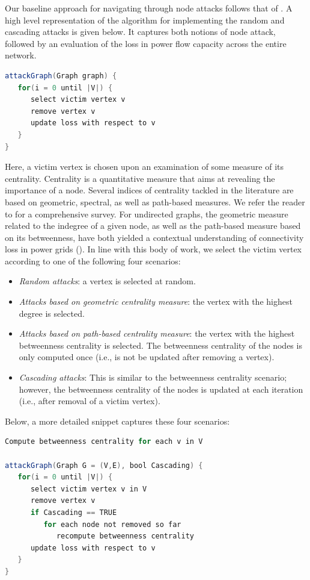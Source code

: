 Our baseline approach for navigating through node attacks follows that of \cite{2000Natur.406..378A}. A high level representation of the algorithm for implementing the random and cascading attacks is given below. It captures both notions of node attack, followed by an evaluation of the loss in power flow capacity across the entire network.
\begin{lstlisting}[language=java]
attackGraph(Graph graph) {
   for(i = 0 until |V|) {
      select victim vertex v
      remove vertex v
      update loss with respect to v
   }
}
\end{lstlisting}
Here, a victim vertex is chosen upon an examination of some measure of its centrality. Centrality is a quantitative measure that aims at revealing the importance of a node. Several indices of centrality tackled in the literature are based on geometric, spectral, as well as path-based measures. We refer the reader to \cite{BoldiVigna14} for a comprehensive survey. For undirected graphs, the geometric measure related to the indegree of a given node, as well as the path-based measure based on its betweenness, have both yielded a contextual understanding of connectivity loss in power grids (\cite{2000Natur.406..378A, JinAl10}). In line with this body of work, we select the victim vertex according to one of the following four scenarios:
\begin{itemize}
\item \emph{Random attacks}: a vertex is selected at random.
\item \emph{Attacks based on geometric centrality measure}: the vertex with the highest degree is selected. 
\item \emph{Attacks based on path-based centrality measure}: the vertex with the highest betweenness centrality is selected. The betweenness centrality of the nodes is only computed once (i.e., is not be updated after removing a vertex). 
\item \emph{Cascading attacks}: This is similar to the betweenness centrality scenario; however, the betweenness centrality of the nodes is updated at each iteration (i.e., after removal of a victim vertex).
\end{itemize}
Below, a more detailed snippet captures these four scenarios:
\begin{lstlisting}[language=java]
Compute betweenness centrality for each v in V

attackGraph(Graph G = (V,E), bool Cascading) {
   for(i = 0 until |V|) {
      select victim vertex v in V
      remove vertex v
      if Cascading == TRUE
         for each node not removed so far
            recompute betweenness centrality
      update loss with respect to v
   }
}
\end{lstlisting}
